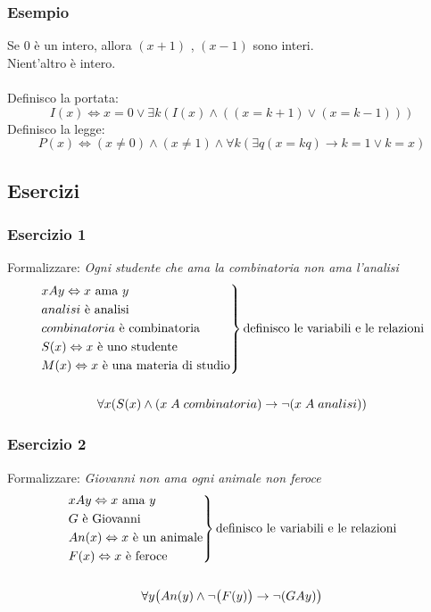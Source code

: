 \documentclass[italian]{article}
\begin{document}
\subsubsection{Esempio}
Se $0$ è un intero, allora $(x+1)$ , $(x-1)$ sono interi.\\
Nient'altro è intero.\\\\
Definisco la portata:
\[
		I(x) \Leftrightarrow x=0 \lor \exists k(I(x) \land ((x=k+1) \lor (x=k-1)))
\]
Definisco la legge:
\[
	P(x) \Leftrightarrow (x \neq 0) \land (x \neq 1) \land \forall k(\exists q (x=kq) \to k = 1 \lor k=x)
\]

\newpage
\subsection{Esercizi}
\subsubsection{Esercizio 1}
Formalizzare: \textit{Ogni studente che ama la combinatoria non ama l'analisi}
\begin{gather*}
	\begin{rcases*}
		xAy \Leftrightarrow x \text{ ama } y \\
		analisi \text{ è analisi} \\
		combinatoria \text{ è combinatoria} \\
		S(x) \Leftrightarrow x \text{ è uno studente} \\
		M(x) \Leftrightarrow x \text{ è una materia di studio} \\
	\end{rcases*} \text{definisco le variabili e le relazioni}\\\\
	\forall x(S(x) \land (x\;A\;combinatoria) \to \lnot(x\;A\;analisi))
\end{gather*}

\subsubsection{Esercizio 2}
Formalizzare: \textit{Giovanni non ama ogni animale non feroce}
\begin{gather*}
	\begin{rcases*}
		xAy \Leftrightarrow x \text{ ama } y \\
		G \text{ è Giovanni} \\
		An(x) \Leftrightarrow x \text{ è un animale} \\
		F(x) \Leftrightarrow x \text{ è feroce} \\
	\end{rcases*} \text{definisco le variabili e le relazioni}\\\\
	\forall y \bigr(An(y) \land \lnot\bigr(F(y)\bigr) \to \lnot(GAy)\bigr)
\end{gather*}
\end{document}
